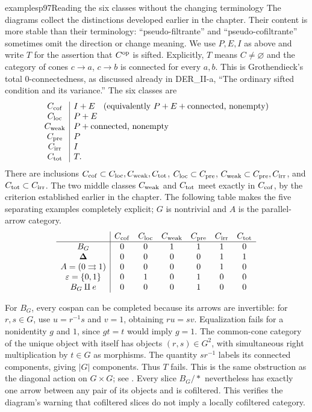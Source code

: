 \begin{dcomment}{examples}{p97}{Reading the six classes without the changing terminology}
The diagrams collect the distinctions developed earlier in the chapter. Their content is more stable than their terminology: ``pseudo-filtrante'' and ``pseudo-cofiltrante'' sometimes omit the direction or change meaning. We use $P,E,I$ as above and write $T$ for the assertion that $C^{\rm op}$ is sifted. Explicitly, $T$ means $C\ne\varnothing$ and the category of cones $c\to a$, $c\to b$ is connected for every $a,b$. This is Grothendieck's total $0$-connectedness, as discussed already in DER\_II-a, ``The ordinary sifted condition and its variance.'' The six classes are
\[
\begin{array}{c|l}
C_{\rm cof}&I+E\quad(\text{equivalently }P+E+\text{connected, nonempty})\\
C_{\rm loc}&P+E\\
C_{\rm weak}&P+\text{connected, nonempty}\\
C_{\rm pre}&P\\
C_{\rm irr}&I\\
C_{\rm tot}&T.
\end{array}
\]
There are inclusions $C_{\rm cof}\subset C_{\rm loc},C_{\rm weak},C_{\rm tot}$, $C_{\rm loc}\subset C_{\rm pre}$, $C_{\rm weak}\subset C_{\rm pre},C_{\rm irr}$, and $C_{\rm tot}\subset C_{\rm irr}$. The two middle classes $C_{\rm weak}$ and $C_{\rm tot}$ meet exactly in $C_{\rm cof}$, by the criterion established earlier in the chapter. The following table makes the five separating examples completely explicit; $G$ is nontrivial and $A$ is the parallel-arrow category.
\[
\begin{array}{c|cccccc}
 &C_{\rm cof}&C_{\rm loc}&C_{\rm weak}&C_{\rm pre}&C_{\rm irr}&C_{\rm tot}\\\hline
B_G&0&0&1&1&1&0\\
\boldsymbol\Delta&0&0&0&0&1&1\\
A=(0\rightrightarrows1)&0&0&0&0&1&0\\
\varepsilon=\{0,1\}&0&1&0&1&0&0\\
B_G\amalg e&0&0&0&1&0&0
\end{array}
\]

For $B_G$, every cospan can be completed because its arrows are invertible: for $r,s\in G$, use $u=r^{-1}s$ and $v=1$, obtaining $ru=sv$. Equalization fails for a nonidentity $g$ and $1$, since $gt=t$ would imply $g=1$. The common-cone category of the unique object with itself has objects $(r,s)\in G^2$, with simultaneous right multiplication by $t\in G$ as morphisms. The quantity $sr^{-1}$ labels its connected components, giving $|G|$ components. Thus $T$ fails. This is the same obstruction as the diagonal action on $G\times G$; see \citet[Lemma 4.19.4]{StacksFiltered2026}. Every slice $B_G/*$ nevertheless has exactly one arrow between any pair of its objects and is cofiltered. This verifies the diagram's warning that cofiltered slices do not imply a locally cofiltered category.


\end{dcomment}
